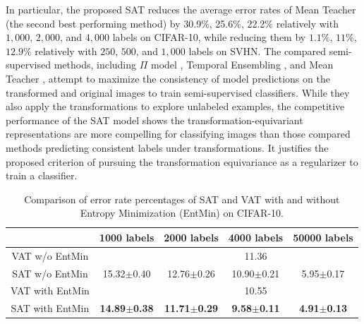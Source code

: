 \documentclass[10pt,journal,compsoc,twoside]{IEEEtran}
\begin{document}
In particular, the proposed SAT reduces the average error rates of Mean Teacher (the second best performing method) by 30.9\%, 25.6\%, 22.2\% relatively with $1,000$, $2,000$, and $4,000$ labels on CIFAR-10, while reducing them by $1.1\%$, $11\%$, $12.9\%$ relatively with $250$, $500$, and $1,000$ labels on SVHN.
The compared semi-supervised methods, including $\Pi$ model \cite{laine2016temporal}, Temporal Ensembling \cite{laine2016temporal}, and Mean Teacher \cite{tarvainen2017mean}, attempt to maximize the consistency of model predictions on the transformed and original images to train semi-supervised classifiers. While they also apply the transformations to explore unlabeled examples, the competitive performance of the SAT model shows
the transformation-equivariant representations are more compelling for classifying images than those compared methods predicting consistent labels under transformations. It justifies the proposed criterion of pursuing the transformation equivariance as a regularizer to train a classifier.



\begin{table}[t!]
\caption{Comparison of error rate percentages of SAT and VAT with and without Entropy Minimization (EntMin) on CIFAR-10.}\label{tab:ablation}
\centering
 \begin{tabular}{ccccc} \toprule
   &1000 labels&2000 labels&4000 labels&50000 labels\\ \midrule
VAT w/o EntMin\cite{miyato2018virtual} &&&11.36\\
SAT w/o EntMin&15.32$\pm$0.40&12.76$\pm$0.26&10.90$\pm$0.21&5.95$\pm$0.17\\\midrule
VAT with EntMin\cite{miyato2018virtual} &&&10.55\\
SAT with EntMin&\textbf{14.89$\pm$0.38}&\textbf{11.71$\pm$0.29}&\textbf{9.58$\pm$0.11}&\textbf{4.91$\pm$0.13}\\
\bottomrule
\end{tabular}
\end{table}
\end{document}
